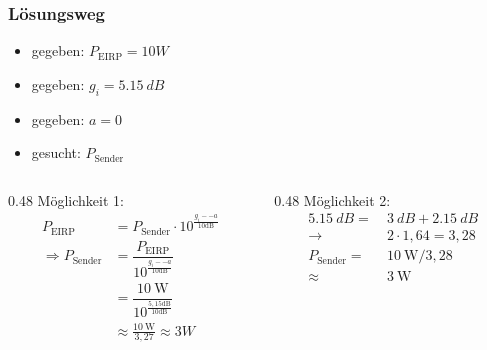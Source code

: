 \begin{frame}
    \frametitle{Lösungsweg}
    \begin{itemize}
        \item gegeben: $P_{\text{EIRP}} = 10W$
        \item gegeben: $g_i = \qty{5,15}{dB}$
        \item gegeben: $a = 0$
        \item gesucht: $P_{\text{Sender}}$
    \end{itemize}
    \pause

    \vspace{1pt}
    \begin{columns}[T]
        \begin{column}{0.48\linewidth}
            \pause
            Möglichkeit 1:
            \begin{equation*}
                \begin{split}
                    P_{\text{EIRP}}               &= P_{\text{Sender}} \cdot 10^{\frac{g_i -- a}{10\text{dB}}}\\
                    \Rightarrow P_{\text{Sender}} &= \dfrac{P_{\text{EIRP}}}{10^{\frac{g_i -- a}{10\text{dB}}}}\\
                                                    &= \dfrac{\qty{10}{\watt}}{10^{\frac{5,15\text{dB}}{10\text{dB}}}}\\
                                                    &\approx \frac{\qty{10}{\watt}}{3,27} \approx 3W
                \end{split}
            \end{equation*}
        \end{column}
        \begin{column}{0.48\linewidth}
            \pause
            Möglichkeit 2:
            \begin{equation*}
                \begin{split}
                    \qty{5,15}{dB}      = & ~\qty{3}{dB} + \qty{2,15}{dB}\\
                    \rightarrow           & ~2 \cdot 1,64 = 3,28\\
                    P_{\mathrm{Sender}} = & ~\qty{10}{\watt}/3,28\\
                                  \approx & ~\qty{3}{\watt}
                \end{split}
            \end{equation*}
        \end{column}
    \end{columns}

\end{frame}

